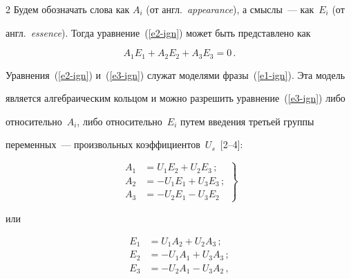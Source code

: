 \begin{multicols}{2}
Будем обозначать слова как $A_i$ (от англ.\ \textit{appearance}), а смыслы~--- как~$E_i$ (от 


англ.\ \textit{essence}). Тогда уравнение~(\ref{e2-ign}) может быть представлено как


\begin{equation}


      A_1 E_1 + A_2 E_2 + A_3 E_3 = 0\,.


      \label{e3-ign}


      \end{equation}





Уравнения~(\ref{e2-ign}) и~(\ref{e3-ign}) служат моделями фразы~(\ref{e1-ign}). Эта модель 


является алгебраическим кольцом и можно разрешить уравнение~(\ref{e3-ign}) либо 


относительно~$A_i$, либо относительно~$E_i$ путем введения третьей группы 


переменных~--- произвольных коэффициентов~$U_s$~[2--4]:


\begin{equation}


\left.


\begin{array}{rl}


      A_1 & = U_1 E_2 + U_2 E_3\,;\\[6pt]


      A_2 &= - U_1 E_1 + U_3 E_3\,;\\[6pt]


      A_3 & = - U_2 E_1 - U_3 E_2


\end{array}


\right\}


\label{e4-ign}


\end{equation}


или


\begin{equation}


\left.


\begin{array}{rl}


      E_1 &= U_1 A_2 + U_2 A_3\,;\\[6pt]


      E_2 &= - U_1 A_1 + U_3 A_3\,;\\[6pt]


      E_3 & = - U_2 A_1 - U_3 A_2\,,



\end{array}
\end{equation}
\end{multicols}
